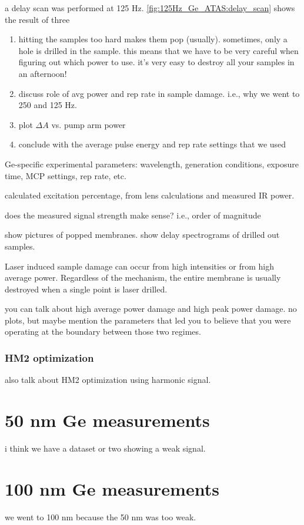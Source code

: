 a delay scan was performed at 125 Hz. \cref{fig:125Hz_Ge_ATAS:delay_scan} shows the result of three 


\begin{enumerate}
	\item hitting the samples too hard makes them pop (usually). sometimes, only a hole is drilled in the sample. this means that we have to be very careful when figuring out which power to use. it's very easy to destroy all your samples in an afternoon!
	\item discuss role of avg power and rep rate in sample damage. i.e., why we went to 250 and 125 Hz.
	\item plot $\Delta A$ vs. pump arm power
	\item conclude with the average pulse energy and rep rate settings that we used
\end{enumerate}


Ge-specific experimental parameters: wavelength, generation conditions, exposure time, MCP settings, rep rate, etc.

calculated excitation percentage, from lens calculations and measured IR power.

does the measured signal strength make sense? i.e., order of magnitude

show pictures of popped membranes. show delay spectrograms of drilled out samples.


Laser induced sample damage can occur from high intensities or from high average power. Regardless of the mechanism, the entire membrane is usually destroyed when a single point is laser drilled. 

you can talk about high average power damage and high peak power damage. no plots, but maybe mention the parameters that led you to believe that you were operating at the boundary between those two regimes.

\subsubsection{HM2 optimization}


also talk about HM2 optimization using harmonic signal. 

\section{50 nm Ge measurements}
i think we have a dataset or two showing a weak signal.


\section{100 nm Ge measurements}
we went to 100 nm because the 50 nm was too weak.

